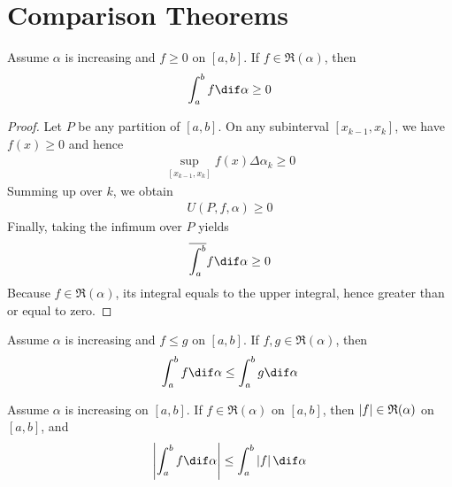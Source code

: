 \documentclass[thmcnt=section, color=blue, 12pt]{my-elegantbook}
\begin{document}
\section{Comparison Theorems}

\begin{theorem}
	Assume $\alpha$ is increasing and $f \geq 0$ on $[a, b]$.
	If $f \in \mathfrak{R}(\alpha)$, then
	\begin{align*}
		\int_a^b f \dif \alpha \geq 0
	\end{align*}
\end{theorem}

\begin{proof}
	Let $P$ be any partition of $[a, b]$.
	On any subinterval $[x_{k-1}, x_k]$,
	we have $f(x) \geq 0$ and hence
	\begin{align*}
		\sup_{[x_{k-1}, x_k]} f(x) \Delta \alpha_k \geq 0
	\end{align*}
	Summing up over $k$, we obtain
	\begin{align*}
		U(P, f, \alpha) \geq 0
	\end{align*}
	Finally, taking the infimum over $P$ yields
	\begin{align*}
		\overline{\int_a^b} f \dif \alpha \geq 0
	\end{align*}
	Because $f \in \mathfrak{R}(\alpha)$,
	its integral equals to the upper integral,
	hence greater than or equal to zero.
\end{proof}

\begin{corollary} \label{cor:2}
	Assume $\alpha$ is increasing and $f \leq g$ on $[a, b]$.
	If $f, g \in \mathfrak{R}(\alpha)$, then
	\begin{align*}
		\int_a^b f \dif \alpha \leq \int_a^b g \dif \alpha
	\end{align*}
\end{corollary}

\begin{theorem}
	Assume $\alpha$ is increasing on $[a, b]$.
	If $f \in \mathfrak{R}(\alpha)$ on $[a, b]$,
	then $\left\lvert f \right\rvert \in \mathfrak{R}(\alpha)$ on $[a, b]$, and
	\begin{align}
		\abs{\int_a^b f \dif \alpha} \leq \int_a^b \abs{f} \dif \alpha
		\label{eq:47}
	\end{align}
\end{theorem}
\end{document}
